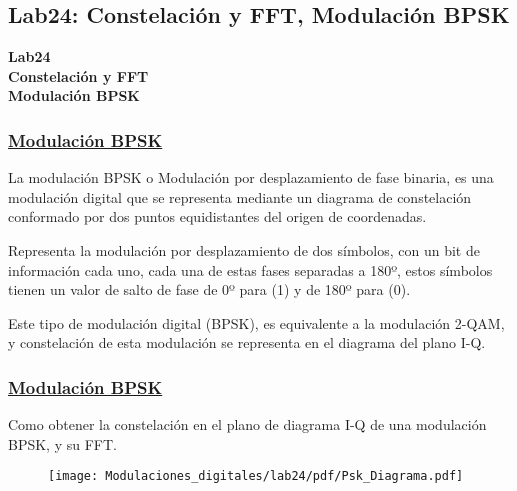 \subsection{Lab24: Constelación y FFT, Modulación BPSK}

\begin{frame}{}


\bfseries{\textrm{\LARGE Lab24\\ \Large Constelación y FFT \\Modulación BPSK}}
\raggedright
\end{frame}

\begin{frame}
   
  \frametitle{\underline{\textbf{Modulación BPSK}}}
  
   \begin{flushleft}
    La modulación BPSK o Modulación por desplazamiento de fase binaria, es una modulación  digital que se representa mediante un diagrama de constelación conformado por dos puntos equidistantes del origen de coordenadas.
   \end{flushleft}
   \begin{flushleft}
   Representa la modulación por desplazamiento de dos símbolos, con un bit de información cada uno, cada una de estas fases separadas a 180º, estos símbolos tienen un valor de salto de fase de 0º para (1) y de 180º para (0).
   \end{flushleft}
   \begin{flushleft}
   Este tipo de modulación digital (BPSK), es equivalente a la modulación 2-QAM, y  constelación de esta modulación se representa en el diagrama del plano I-Q.
   \end{flushleft} 
 \end{frame}

\begin{frame}
   
  \frametitle{\underline{\textbf{Modulación BPSK}}}
   \begin{flushleft}
   Como obtener la constelación en el plano de diagrama I-Q de una modulación BPSK, y su FFT.
   \end{flushleft}
   \begin{figure}[H]
\vspace{-3mm}
\centering
\texttt{[image: Modulaciones\_digitales/lab24/pdf/Psk\_Diagrama.pdf]}
\end{figure}
\end{frame}

